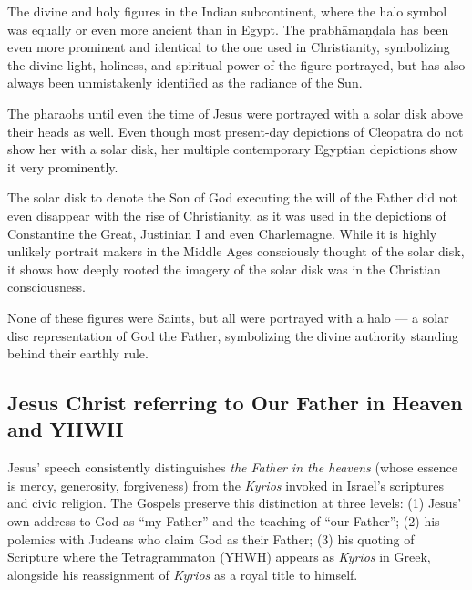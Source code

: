 The divine and holy figures in the Indian subcontinent, where the halo symbol was equally or even more ancient than in Egypt.
The prabhāmaṇḍala has been even more prominent and identical to the one used in Christianity, symbolizing the divine light, holiness, and spiritual power of the figure portrayed, but has also always been unmistakenly identified as the radiance of the Sun.

The pharaohs until even the time of Jesus were portrayed with a solar disk above their heads as well.
Even though most present-day depictions of Cleopatra do not show her with a solar disk, her multiple contemporary Egyptian depictions show it very prominently.

The solar disk to denote the Son of God executing the will of the Father did not even disappear with the rise of Christianity, as it was used in the depictions of Constantine the Great, Justinian I and even Charlemagne.
While it is highly unlikely portrait makers in the Middle Ages consciously thought of the solar disk, it shows how deeply rooted the imagery of the solar disk was in the Christian consciousness.

None of these figures were Saints, but all were portrayed with a halo — a solar disc representation of God the Father, symbolizing the divine authority standing behind their earthly rule.

\subsection{Jesus Christ referring to Our Father in Heaven and YHWH}\label{subsec:jesus-christ-referring-to-our-father-in-heaven-and-yhwh}
Jesus’ speech consistently distinguishes \emph{the Father in the heavens} (whose essence is mercy, generosity, forgiveness) from the \emph{Kyrios} invoked in Israel’s scriptures and civic religion. The Gospels preserve this distinction at three levels: (1) Jesus’ own address to God as “my Father” and the teaching of “our Father”; (2) his polemics with Judeans who claim God as their Father; (3) his quoting of Scripture where the Tetragrammaton (YHWH) appears as \emph{Kyrios} in Greek, alongside his reassignment of \emph{Kyrios} as a royal title to himself.

